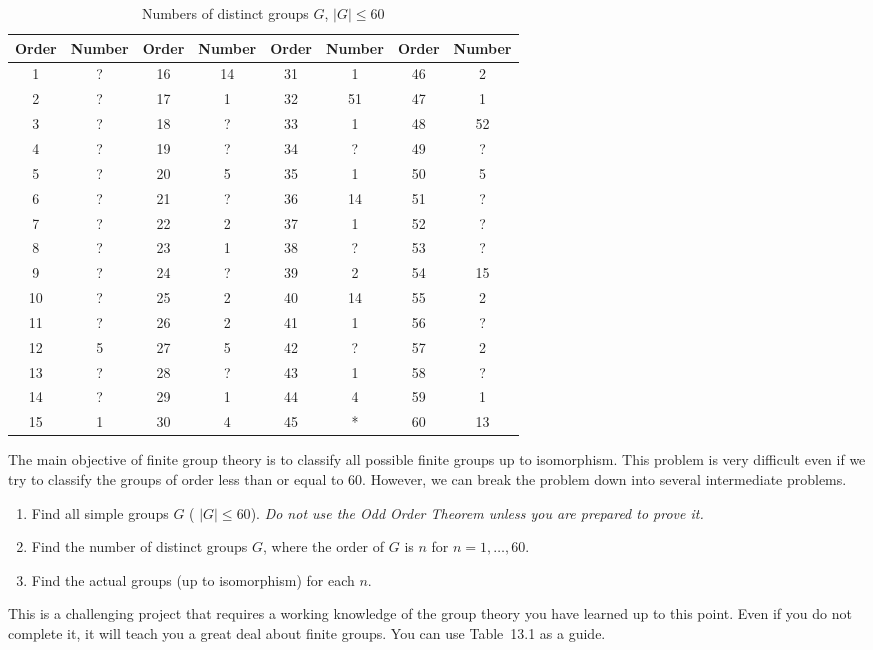  
\begin{table}[htb]
\caption{Numbers of distinct groups $G$, $|G| \leq 60$ }{\small
\begin{center}
\begin{tabular}{|cc|cc|cc|cc|}
\hline
Order & Number & Order & Number & Order & Number & Order &
Number \\
\hline
1  & ?  & 16 & 14 & 31 & 1  & 46 & 2  \\
2  & ?  & 17 & 1  & 32 & 51 & 47 & 1  \\
3  & ?  & 18 & ?  & 33 & 1  & 48 & 52 \\
4  & ?  & 19 & ?  & 34 & ?  & 49 & ?  \\
5  & ?  & 20 & 5  & 35 & 1  & 50 & 5  \\
6  & ?  & 21 & ?  & 36 & 14 & 51 & ?  \\
7  & ?  & 22 & 2  & 37 & 1  & 52 & ?  \\
8  & ?  & 23 & 1  & 38 & ?  & 53 & ?  \\
9  & ?  & 24 & ?  & 39 & 2  & 54 & 15 \\
10 & ?  & 25 & 2  & 40 & 14 & 55 & 2  \\
11 & ?  & 26 & 2  & 41 & 1  & 56 & ?  \\
12 & 5  & 27 & 5  & 42 & ?  & 57 & 2  \\
13 & ?  & 28 & ?  & 43 & 1  & 58 & ?  \\
14 & ?  & 29 & 1  & 44 & 4  & 59 & 1  \\
15 & 1  & 30 & 4  & 45 & *  & 60 & 13 \\
\hline
\end{tabular}
\end{center}}
\end{table}
 
 
{\small
 
\noindent 
The main objective of finite group theory is to classify all possible
finite groups up to isomorphism.  This problem is very difficult even
if we try to classify the groups of order less than or equal to 60.
However, we can break the problem down into several intermediate
problems. 
\begin{enumerate}
 
\item
Find all simple groups $G$ ( $|G| \leq 60$). {\em Do not use the Odd
Order Theorem unless you are prepared to prove it.}
 
\item
Find the number of distinct groups $G$, where the order of $G$ is $n$
for $n = 1, \ldots, 60$. 
 
\item
Find the  actual groups (up to isomorphism) for each $n$.
 
\end{enumerate}
This is a challenging project that requires a working knowledge of the
group theory you have learned up to this point. Even if you do
not complete it, it will teach you a great deal about finite groups. You
can use Table~13.1 as a guide. 
}
 
